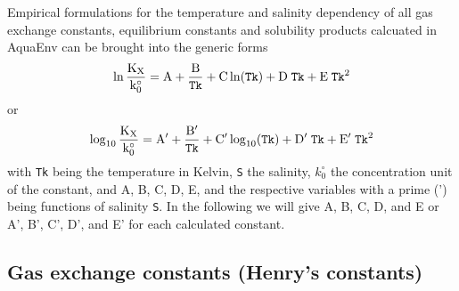 \documentclass[a4paper]{article}
\begin{document}
Empirical formulations for the temperature and salinity dependency of all gas exchange constants, equilibrium constants and solubility products calcuated in \textsf{AquaEnv} can be brought into the generic forms 
\begin{equation}
\rm \ln{\frac{K_X}{k_0^\circ}} = A + \frac{B}{\mbox{\texttt{Tk}}} + C \ln(\mbox{\texttt{Tk}}) + D \; \mbox{\texttt{Tk}} + E \;\mbox{\texttt{Tk}}^2
\end{equation}
or
\begin{equation}
\rm \log_{10}{\frac{K_X}{k_0^\circ}} = A' + \frac{B'}{\mbox{\texttt{Tk}}} + C' \log_{10}(\mbox{\texttt{Tk}}) + D' \; \mbox{\texttt{Tk}} + E' \;\mbox{\texttt{Tk}}^2
\end{equation}
with \texttt{Tk} being the temperature in Kelvin, \texttt{S} the salinity, $k_0^\circ$ the concentration unit of the constant, and A, B, C, D, E, and the respective variables with a prime (') being functions of salinity \texttt{S}.
In the following we will give A, B, C, D, and E  or A', B', C', D', and E' for each calculated constant.


\subsection{Gas exchange constants (Henry's constants)}
\end{document}

